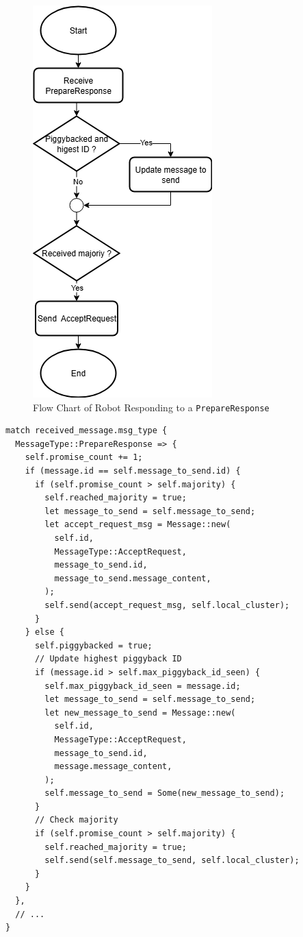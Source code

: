\documentclass[12pt,a4paper]{article}
\begin{document}
\begin{itemize}
\begin{figure}
    \centering
    \includegraphics[width=0.5\linewidth]{images/prepare_response.png}
    \caption{Flow Chart of Robot Responding to a \texttt{PrepareResponse}}   
    \label{fig:prepare-response}
\end{figure}

\begin{lstlisting}[float, caption={Robot Receives a \texttt{PrepareResponse}}, label={lst:prepare-response}]
match received_message.msg_type {
  MessageType::PrepareResponse => {
    self.promise_count += 1;
    if (message.id == self.message_to_send.id) {
      if (self.promise_count > self.majority) {
        self.reached_majority = true;
        let message_to_send = self.message_to_send;
        let accept_request_msg = Message::new(
          self.id,
          MessageType::AcceptRequest,
          message_to_send.id,
          message_to_send.message_content,
        );
        self.send(accept_request_msg, self.local_cluster);
      }
    } else {
      self.piggybacked = true;
      // Update highest piggyback ID
      if (message.id > self.max_piggyback_id_seen) {
        self.max_piggyback_id_seen = message.id;
        let message_to_send = self.message_to_send;
        let new_message_to_send = Message::new(
          self.id,
          MessageType::AcceptRequest,
          message_to_send.id,
          message.message_content,
        );
        self.message_to_send = Some(new_message_to_send);
      }
      // Check majority
      if (self.promise_count > self.majority) {
        self.reached_majority = true;
        self.send(self.message_to_send, self.local_cluster);
      }
    }
  },
  // ...
}
\end{lstlisting}


\end{itemize}
\end{document}
